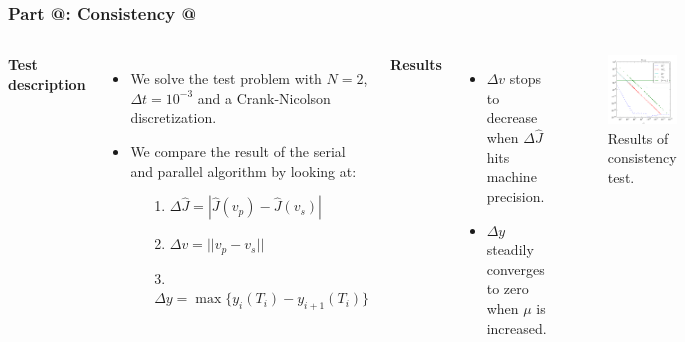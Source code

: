 \documentclass[9pt]{beamer}
\makeatletter
\newcommand*{\rom}[1]{\expandafter\@slowromancap\romannumeral #1@}
\makeatother
\begin{document}
\begin{frame}
\frametitle{\textbf{ Part \rom{4}:} Consistency \rom{2}}
\begin{columns}
\textbf{Test description}
\begin{itemize}
\item{We solve the test problem with $N=2$, $\Delta t=10^{-3}$ and a Crank-Nicolson discretization.}
\item{We compare the result of the serial and parallel algorithm by looking at: \begin{itemize}
\item[1.]{{\small $\Delta \hat J=|\hat J(v_p)-\hat J(v_s)|$}}
\item[2.]{{\small $\Delta v = ||v_p-v_s||$}}
\item[3.]{{\small $\Delta y=\max\{y_i(T_i)-y_{i+1}(T_i)\}$}}
\end{itemize}}
\end{itemize}
\textbf{Results}
\begin{itemize}
\item{{\small $\Delta v$} stops to decrease when {\small $\Delta \hat J$} hits machine precision.}
\item{{\small $\Delta y$} steadily converges to zero when $\mu$ is increased.}
\end{itemize}
\begin{figure}[!h]
\centering
\includegraphics[scale=0.35]{con2.png}
\caption{{\tiny Results of consistency test.}}
\end{figure}
\end{columns}
\end{frame}
\end{document}
